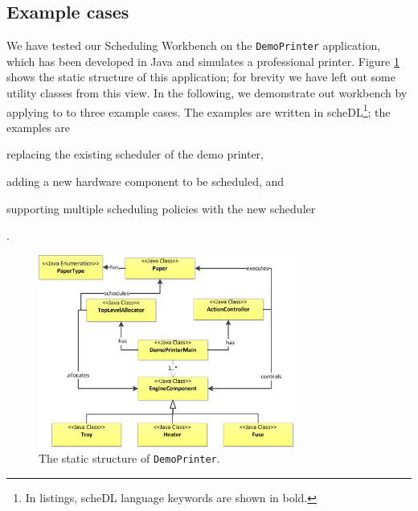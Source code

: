 	\subsection{Example cases}
	We have tested our Scheduling Workbench on the \texttt{DemoPrinter} application,
	which has been developed in Java and simulates a professional printer. Figure \ref{fig:demoprinter}
	shows the static structure of this application; for brevity we have left out
	some utility classes from this view.
	In the following, we demonstrate out workbench by applying to to three example cases. The examples are written in
	\textsf{scheDL}\footnote{In listings, \textsf{scheDL} language keywords are
	shown in bold.}; the examples are \begin{inparaenum} \item
	replacing the existing scheduler of the demo printer, \item adding a new
	hardware component to be scheduled, and \item supporting multiple scheduling
	policies with the new scheduler\end{inparaenum}.
	\begin{figure}
	\begin{center}
	\includegraphics[width=0.75\textwidth]{chapteroce/images/demoprinter.png}
	\caption{The static structure of \texttt{DemoPrinter}.}
	\label{fig:demoprinter}
	\end{center}
	\end{figure}
